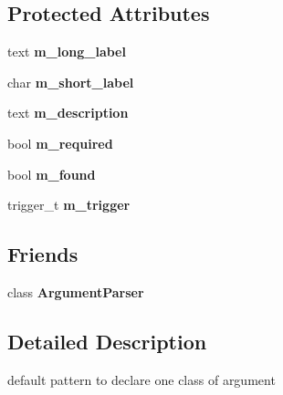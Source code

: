 \subsection*{Protected Attributes}
\begin{DoxyCompactItemize}
\item 
\mbox{\label{classez_1_1arguments_1_1Argument_ac0857a07d17c78753b2609dc15b516b4}} 
text {\bfseries m\+\_\+long\+\_\+label}
\item 
\mbox{\label{classez_1_1arguments_1_1Argument_ac21cad37b24aaa5e2bc281a197e76c21}} 
char {\bfseries m\+\_\+short\+\_\+label}
\item 
\mbox{\label{classez_1_1arguments_1_1Argument_a85dccf7365873de6e4d18b80e78ee523}} 
text {\bfseries m\+\_\+description}
\item 
\mbox{\label{classez_1_1arguments_1_1Argument_a8368ac83154f39c0082205460bad417c}} 
bool {\bfseries m\+\_\+required}
\item 
\mbox{\label{classez_1_1arguments_1_1Argument_aed5b51cd7d343c0016a815fddb081684}} 
bool {\bfseries m\+\_\+found}
\item 
\mbox{\label{classez_1_1arguments_1_1Argument_af5f2a640fe82cbcfcc2bb4121a6e3d50}} 
trigger\+\_\+t {\bfseries m\+\_\+trigger}
\end{DoxyCompactItemize}
\subsection*{Friends}
\begin{DoxyCompactItemize}
\item 
\mbox{\label{classez_1_1arguments_1_1Argument_a55c9e1ac006a645af402e3aee6b64e00}} 
class {\bfseries Argument\+Parser}
\end{DoxyCompactItemize}


\subsection{Detailed Description}
default pattern to declare one class of argument 

